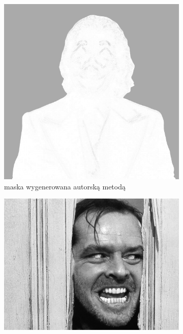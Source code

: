 \begin{figure}[H]
\begin{subfigure}{0.205\textwidth}
            \includegraphics[width = \textwidth]{img/6-comp/joker_mask_c20_inv0_bg10_obj5_ed5.png}
            \caption{maska wygenerowana autorską metodą}
            \label{comp-comp-joker-shining-b}
        \end{subfigure}
        \begin{subfigure}{0.275\textwidth}
            \centering
            \includegraphics[width = \textwidth]{img/6-comp/shining_original_c10_inv0.png}

\end{subfigure}
\end{figure}
